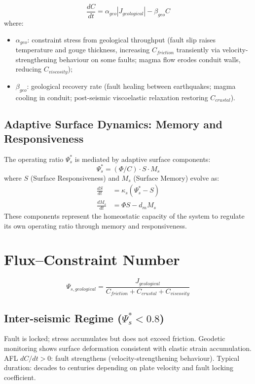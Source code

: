 \documentclass[11pt]{article}
\begin{document}
\begin{equation}
\frac{dC}{dt} = \alpha_{geo}|J_{geological}| - \beta_{geo} C
\end{equation}
where:
\begin{itemize}
    \item $\alpha_{geo}$: constraint stress from geological throughput (fault slip raises temperature
          and gouge thickness, increasing $C_{friction}$ transiently via velocity-strengthening
          behaviour on some faults; magma flow erodes conduit walls, reducing $C_{viscosity}$);
    \item $\beta_{geo}$: geological recovery rate (fault healing between earthquakes; magma
          cooling in conduit; post-seismic viscoelastic relaxation restoring $C_{crustal}$).
\end{itemize}

\subsection{Adaptive Surface Dynamics: Memory and Responsiveness}

The operating ratio $\Psi_s^*$ is mediated by adaptive surface components:
\begin{equation}
\Psi_s^* = (\Phi/C) \cdot S \cdot M_s
\end{equation}
where $S$ (Surface Responsiveness) and $M_s$ (Surface Memory) evolve as:
\begin{align}
\frac{dS}{dt} &= \kappa_s (\Psi_s^* - S) \\
\frac{dM_s}{dt} &= \Phi S - d_m M_s
\end{align}
These components represent the homeostatic capacity of the system to regulate its own operating ratio through memory and responsiveness.

\section{Flux--Constraint Number}

\begin{equation}
\Psi_{s,geological} = \frac{J_{geological}}{C_{friction} + C_{crustal} + C_{viscosity}}
\end{equation}

\subsection{Inter-seismic Regime ($\Psi_s^* < 0.8$)}

Fault is locked; stress accumulates but does not exceed friction. Geodetic monitoring shows
surface deformation consistent with elastic strain accumulation. AFL $dC/dt > 0$: fault strengthens
(velocity-strengthening behaviour). Typical duration: decades to centuries depending on plate
velocity and fault locking coefficient.
\end{document}
